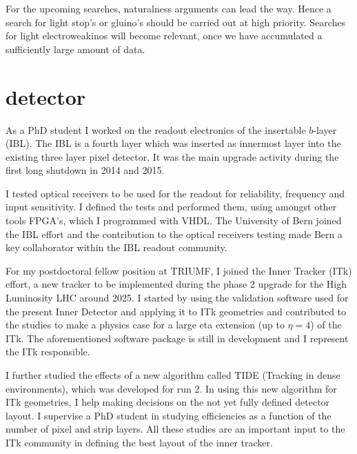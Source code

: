 \documentclass[]{cv} %
\begin{document}
\begin{statement}
For the upcoming searches, naturalness arguments can lead the way. Hence a
search for light stop's or gluino's should be carried out at high priority.
Searches for light electroweakinos will become relevant, once we have
accumulated a sufficiently large amount of data.

\section{detector}

As a PhD student I worked on the readout electronics of the insertable $b$-layer
(IBL). The IBL is a fourth layer which was inserted as innermost layer into the
existing three layer pixel detector. It was the main upgrade activity during the
first long shutdown in 2014 and 2015.

I tested optical receivers to be used for the readout for reliability, frequency
and input sensitivity. I defined the tests and performed them, using amongst
other tools FPGA's, which I programmed with VHDL. The University of Bern joined
the IBL effort and the contribution to the optical receivers testing made Bern a
key collaborator within the IBL readout community.

For my postdoctoral fellow position at TRIUMF, I joined the Inner Tracker (ITk)
effort, a new tracker to be implemented during the phase 2 upgrade for the High
Luminosity LHC around 2025. I started by using the validation software used for
the present Inner Detector and applying it to ITk geometries and contributed to
the studies to make a physics case for a large eta extension (up to $\eta = 4$)
of the ITk. The aforementioned software package is still in development and I
represent the ITk responsible.

I further studied the effects of a new algorithm called TIDE (Tracking in dense
environments), which was developed for run 2. In using this new algorithm for
ITk geometries, I help making decisions on the not yet fully defined detector
layout. I supervise a PhD student in studying efficiencies as a function of the
number of pixel and strip layers. All these studies are an important input to
the ITk community in defining the best layout of the inner tracker.

\end{statement}
\end{document}
